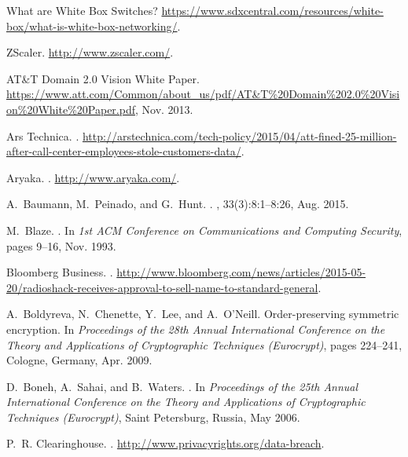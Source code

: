 \documentclass[letterpaper,twocolumn,10pt]{article}
\begin{document}
{\begin{thebibliography}{10}
{What are White Box Switches?}
\newblock
  \url{https://www.sdxcentral.com/resources/white-box/what-is-white-box-networking/}.

{ZScaler}.
\newblock \url{http://www.zscaler.com/}.

{{AT}\&T Domain 2.0 Vision White Paper}.
\newblock
  \url{https://www.att.com/Common/about_us/pdf/AT\&T\%20Domain\%202.0\%20Vision\%20White\%20Paper.pdf},
  Nov. 2013.

{Ars Technica}.
.
\newblock
  \url{http://arstechnica.com/tech-policy/2015/04/att-fined-25-million-after-call-center-employees-stole-customers-data/}.

{Aryaka}.
.
\newblock \url{http://www.aryaka.com/}.

A.~Baumann, M.~Peinado, and G.~Hunt.
.
, 33(3):8:1--8:26, Aug.
  2015.

M.~Blaze.
.
\newblock In {\em 1st {ACM} Conference on Communications and Computing
  Security}, pages 9--16, Nov. 1993.

{Bloomberg Business}.
.
\newblock
  \url{http://www.bloomberg.com/news/articles/2015-05-20/radioshack-receives-approval-to-sell-name-to-standard-general}.

A.~Boldyreva, N.~Chenette, Y.~Lee, and A.~O'Neill.
\newblock Order-preserving symmetric encryption.
\newblock In {\em Proceedings of the 28th Annual International Conference on
  the Theory and Applications of Cryptographic Techniques ({Eurocrypt})}, pages
  224--241, Cologne, Germany, Apr. 2009.

D.~Boneh, A.~Sahai, and B.~Waters.
.
\newblock In {\em Proceedings of the 25th Annual International Conference on
  the Theory and Applications of Cryptographic Techniques ({Eurocrypt})}, Saint
  Petersburg, Russia, May 2006.

P.~R. Clearinghouse.
.
\newblock \url{http://www.privacyrights.org/data-breach}.


\end{thebibliography}}
\end{document}
